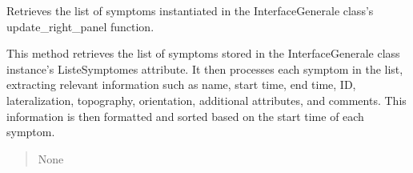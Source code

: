 \documentclass[letterpaper,10pt,english]{sphinxmanual}
\begin{document}
\begin{fulllineitems}
\begin{fulllineitems}
\begin{quote}
\begin{description}
\end{description}\end{quote}

\end{fulllineitems}


\begin{fulllineitems}
\label{\detokenize{general_interface:general_interface.FriseSymptomes.afficher}}
\pysigstartsignatures
{}
\pysigstopsignatures
\sphinxAtStartPar
Retrieves the list of symptoms instantiated in the InterfaceGenerale class’s update\_right\_panel function.

\sphinxAtStartPar
This method retrieves the list of symptoms stored in the InterfaceGenerale class instance’s ListeSymptomes attribute.
It then processes each symptom in the list, extracting relevant information such as name, start time, end time,
ID, lateralization, topography, orientation, additional attributes, and comments. This information is then formatted
and sorted based on the start time of each symptom.
\begin{quote}\begin{description}
\sphinxAtStartPar
None

\end{description}\end{quote}

\end{fulllineitems}


\end{fulllineitems}

\end{document}
